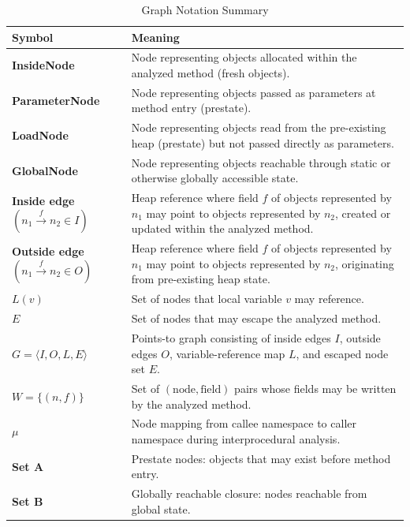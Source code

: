 \documentclass{article}
\begin{document}
\begin{table}[H]
\centering
\caption{Graph Notation Summary}
\label{tab:Notation-Summary}
\begin{tabular}{@{}lp{10cm}@{}}
\toprule
\textbf{Symbol} & \textbf{Meaning} \\ \midrule

\textbf{InsideNode} 
& Node representing objects allocated within the analyzed method (fresh objects). \\

\textbf{ParameterNode} 
& Node representing objects passed as parameters at method entry (prestate). \\

\textbf{LoadNode} 
& Node representing objects read from the pre-existing heap (prestate) but not passed directly as parameters. \\

\textbf{GlobalNode} 
& Node representing objects reachable through static or otherwise globally accessible state. \\

\textbf{Inside edge} $(n_1 \xrightarrow{f} n_2 \in I)$ 
& Heap reference where field $f$ of objects represented by $n_1$ may point to objects represented by $n_2$, created or updated within the analyzed method. \\

\textbf{Outside edge} $(n_1 \xrightarrow{f} n_2 \in O)$ 
& Heap reference where field $f$ of objects represented by $n_1$ may point to objects represented by $n_2$, originating from pre-existing heap state. \\

\textbf{$L(v)$} 
& Set of nodes that local variable $v$ may reference. \\

\textbf{$E$} 
& Set of nodes that may escape the analyzed method. \\

\textbf{$G = \langle I, O, L, E \rangle$} 
& Points-to graph consisting of inside edges $I$, outside edges $O$, variable-reference map $L$, and escaped node set $E$. \\

\textbf{$W = \{(n,f)\}$} 
& Set of $(\text{node}, \text{field})$ pairs whose fields may be written by the analyzed method. \\

\textbf{$\mu$} 
& Node mapping from callee namespace to caller namespace during interprocedural analysis. \\

\textbf{Set A} 
& Prestate nodes: objects that may exist before method entry. \\

\textbf{Set B} 
& Globally reachable closure: nodes reachable from global state. \\

\bottomrule
\end{tabular}
\end{table}
\end{document}

